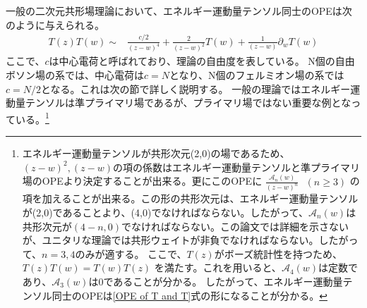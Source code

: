 \documentclass[11pt, dvipdfmx]{article}
\numberwithin{equation}{section}
\newcommand{\blankline}{\par\vspace{\baselineskip}} %
\begin{document}
一般の二次元共形場理論において、エネルギー運動量テンソル同士のOPEは次のように与えられる。
\begin{align}
    T(z)T(w)\sim& \frac{c/2}{(z-w)^4} + \frac{2}{(z-w)^2}T(w) + \frac{1}{(z-w)}\partial_w T(w)\label{OPE of T and T}
\end{align}
ここで、$c$は中心電荷と呼ばれており、理論の自由度を表している。
N個の自由ボソン場の系では、中心電荷は$c=N$となり、N個のフェルミオン場の系では$c=N/2$となる。これは次の節で詳しく説明する。
一般の理論ではエネルギー運動量テンソルは準プライマリ場であるが、プライマリ場ではない重要な例となっている。\footnote{
    エネルギー運動量テンソルが共形次元(2,0)の場であるため、$(z-w)^2,(z-w)$の項の係数はエネルギー運動量テンソルと準プライマリ場のOPEより決定することが出来る。更にこのOPEに
        $\frac{\mathcal{A}_n(w)}{(z-w)^n} \ \ \ (n\geq 3)$
    の項を加えることが出来る。この形の共形次元は、エネルギー運動量テンソルが(2,0)であることより、(4,0)でなければならない。したがって、$\mathcal{A}_n(w)$は共形次元が$(4-n,0)$でなければならない。この論文では詳細を示さないが、ユニタリな理論では共形ウェイトが非負でなければならない。したがって、$n=3,4$のみが適する。
ここで、$T(z)$がボーズ統計性を持つため、
$    T(z)T(w)    =T(w)T(z)$
を満たす。これを用いると、$\mathcal{A}_4(w)$は定数であり、$\mathcal{A}_3(w)$は0であることが分かる。
    したがって、エネルギー運動量テンソル同士のOPEは\eqref{OPE of T and T}式の形になることが分かる。
}
\blankline
\end{document}
